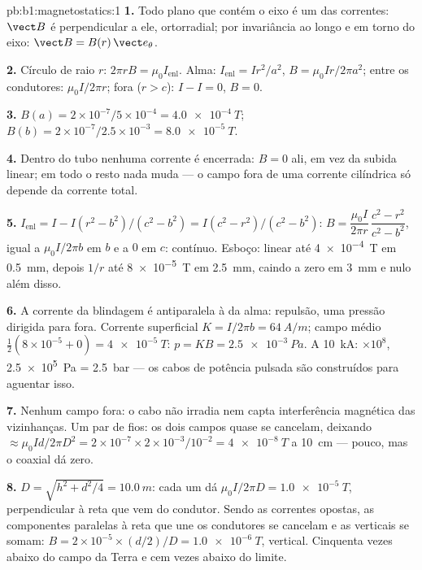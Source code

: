 \begin{solution}{pb:b1:magnetostatics:1}
\textbf{1.} Todo plano que contém o eixo é um  das
correntes: $\vect B$ é perpendicular a ele, ortorradial; por invariância
ao longo e em torno do eixo: $\vect B = B(r)\,\vect e_\theta$.

\textbf{2.} Círculo de raio $r$: $2\pi rB = \mu_0I_{\text{enl}}$. Alma:
$I_{\text{enl}} = Ir^2/a^2$, $B = \mu_0Ir/2\pi a^2$; entre os condutores: $\mu_0I/2\pi r$;
fora ($r > c$): $I - I = 0$, $B = 0$.

\textbf{3.} $B(a) = 2 \times 10^{-7}/5 \times 10^{-4} = \qty{4.0e-4}{T}$; $B(b) = 2 \times
10^{-7}/2.5 \times 10^{-3} = \qty{8.0e-5}{T}$.

\textbf{4.} Dentro do tubo nenhuma corrente é encerrada: $B = 0$ ali, em vez
da subida linear; em todo o resto nada muda --- o campo fora
de uma corrente cilíndrica só depende da corrente total.

\textbf{5.} $I_{\text{enl}} = I - I(r^2 - b^2)/(c^2 - b^2) = I(c^2 - r^2)/(c^2 -
b^2)$: $B = \dfrac{\mu_0I}{2\pi r}\,\dfrac{c^2 - r^2}{c^2 - b^2}$, igual a $\mu_0I/2\pi b$ em
$b$ e a $0$ em $c$: contínuo. Esboço: linear até \qty{4e-4}{T} em
\qty{0.5}{mm}, depois $1/r$ até \qty{8e-5}{T} em \qty{2.5}{mm}, caindo a zero em
\qty{3}{mm} e nulo além disso.

\textbf{6.} A corrente da blindagem é antiparalela à da alma: repulsão,
uma pressão dirigida para fora. Corrente superficial $K = I/2\pi b = \qty{64}{A/m}$; campo médio
$\tfrac12(8 \times 10^{-5} + 0) = \qty{4e-5}{T}$: $p = KB = \qty{2.5e-3}{Pa}$. A
\qty{10}{kA}: $\times10^8$, \qty{2.5e5}{Pa} = \qty{2.5}{bar} --- os cabos de
potência pulsada são construídos para aguentar isso.

\textbf{7.} Nenhum campo fora: o cabo não irradia nem capta
interferência magnética das vizinhanças. Um par de fios: os dois
campos quase se cancelam, deixando $\approx \mu_0Id/2\pi D^2 = 2 \times 10^{-7} \times 2 \times
10^{-3}/10^{-2} = \qty{4e-8}{T}$ a \qty{10}{cm} --- pouco, mas o coaxial dá
zero.

\textbf{8.} $D = \sqrt{h^2 + d^2/4} = \qty{10.0}{m}$: cada um dá $\mu_0I/2\pi D =
\qty{1.0e-5}{T}$, perpendicular à reta que vem do condutor. Sendo as
correntes opostas, as componentes paralelas à reta que une
os condutores se cancelam e as verticais se somam: $B = 2 \times 10^{-5} \times
(d/2)/D = \qty{1.0e-6}{T}$, vertical. Cinquenta vezes abaixo do campo da Terra
e cem vezes abaixo do limite.


\end{solution}
